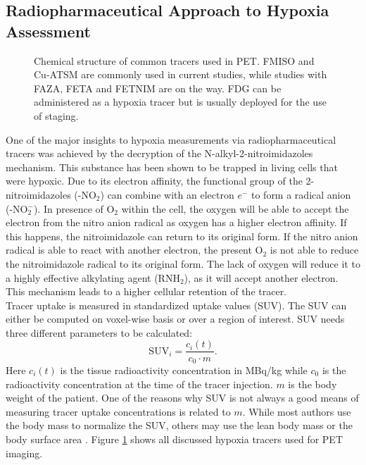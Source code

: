 \subsection{Radiopharmaceutical Approach to Hypoxia Assessment}\label{chap:tracers}
\begin{figure}[p]
\centering
{}
\hspace{0.3cm}
\hspace{0.3cm}
\hspace{0.3cm}
\hspace{0.3cm}
\caption{Chemical structure of common tracers used in PET. FMISO and Cu-ATSM are commonly used in current studies, while studies with FAZA, FETA and FETNIM are on the way. FDG can be administered as a hypoxia tracer but is usually deployed for the use of staging.}
\label{fig:hypoxiatracer}
\end{figure}
One of the major insights to hypoxia measurements via radiopharmaceutical tracers was achieved by the decryption of the N-alkyl-2-nitroimidazoles mechanism. This substance has been shown to be trapped in living cells that were hypoxic. Due to its electron affinity, the functional group of the 2-nitroimidazoles (-NO$_2$) can combine with an electron $e^-$ to form a radical anion (-NO$_2^-$). In presence of O$_2$ within the cell, the oxygen will be able to accept the electron from the nitro anion radical as oxygen has a higher electron affinity. If this happens, the nitroimidazole can return to its original form. If the nitro anion radical is able to react with another electron, the present O$_2$ is not able to reduce the nitroimidazole radical to its original form. The lack of oxygen will reduce it to a highly effective alkylating agent (RNH$_2$), as it will accept another electron. This mechanism leads to a higher cellular retention of the tracer.\\Tracer uptake is measured in standardized uptake values (SUV). The SUV can either be computed on voxel-wise basis or over a region of interest. SUV needs three different parameters to be calculated:
\begin{equation}
\mathrm{SUV}_i = \frac{c_i(t)}{c_0\cdot m}.
\end{equation}
Here $c_i(t)$ is the tissue radioactivity concentration in MBq/kg while $c_0$ is the radioactivity concentration at the time of the tracer injection. $m$ is the body weight of the patient. One of the reasons why SUV is not always a good means of measuring tracer uptake concentrations is related to $m$. While most authors use the body mass to normalize the SUV, others may use the lean body mass \cite{pmid8234714} or the body surface area \cite{pmid8271040}. Figure \ref{fig:hypoxiatracer} shows all discussed hypoxia tracers used for PET imaging.
